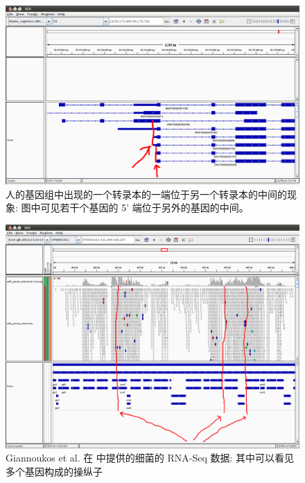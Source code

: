 \begin{figure}[!t]
\centering
\includegraphics[width=\textwidth]{figures/disc/disc-human-gene-alternative-start-1.png}
\caption[人的基因组中出现的一个转录本的一端位于另一个转录本的中间的现象]
{人的基因组中出现的一个转录本的一端位于另一个转录本的中间的现象: 图中可见若干个基因的 5' 端位于另外的基因的中间。}
\label{disc-human-gene-alternative-start-1}
\end{figure}

\begin{figure}[!t]
\centering
\includegraphics[width=\textwidth]{figures/disc/disc-bacteria-operons-1.png}
\caption[Giannoukos et al. 在  中提供的细菌的 RNA-Seq 数据]
{Giannoukos et al. 在  中提供的细菌的 RNA-Seq 数据: 
其中可以看见多个基因构成的操纵子}
\label{disc-bacteria-operons-1}
\end{figure}

